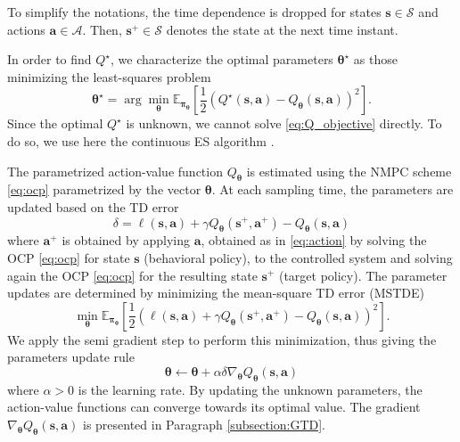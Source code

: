 \documentclass[letterpaper, 10pt, conference]{ieeeconf}
\begin{document}
To simplify the notations, the time dependence is dropped for states $\mathbf{s}\in\mathcal{S}$ and actions $\mathbf{a}\in\mathcal{A}$.
Then, $\mathbf{s}^+\in\mathcal{S}$ denotes the state at the next time instant.

In order to find $Q^{\star}$, we characterize the optimal parameters $\boldsymbol{\theta}^{\star}$ as those minimizing the least-squares problem
\begin{equation}\label{eq:Q_objective}
	\boldsymbol{\theta}^{\star} = \arg \min_{\boldsymbol{\theta}} \mathbb{E}_{\boldsymbol{\pi}_{\boldsymbol{\theta}}}\left[\frac{1}{2}\left(Q^{\star}(\mathbf{s}, \mathbf{a})-Q_{\boldsymbol{\theta}}(\mathbf{s}, \mathbf{a})\right)^2\right].
\end{equation}
Since the optimal $Q^{\star}$ is unknown, we cannot solve \eqref{eq:Q_objective} directly.
To do so, we use here the continuous ES algorithm \cite{van2009theoretical}.

The parametrized action-value function $Q_{\boldsymbol{\theta}}$ is estimated using the NMPC scheme \eqref{eq:ocp} parametrized by the vector $\boldsymbol{\theta}$.
At each sampling time, the parameters are updated based on the TD error
\begin{equation}\label{eq:sarsa_tderror}
	\delta = \ell\left(\mathbf{s}, \mathbf{a}\right)  + \gamma Q_{\boldsymbol{\theta}}\left(\mathbf{s}^+, \mathbf{a}^+\right) - Q_{\boldsymbol{\theta}}\left(\mathbf{s}, \mathbf{a}\right)
\end{equation}
where $\mathbf{a}^+$ is obtained by applying $\mathbf{a}$, obtained as in \eqref{eq:action} by solving the OCP \eqref{eq:ocp} for state $\mathbf{s}$ (behavioral policy), to the controlled system and solving again the OCP \eqref{eq:ocp} for the resulting state $\mathbf{s}^+$ (target policy).
The parameter updates are determined by minimizing the mean-square TD error (MSTDE) %
\begin{equation}
	\min_{\boldsymbol{\theta}} \mathbb{E}_{\boldsymbol{\pi}_{\boldsymbol{\theta}}}\left[\frac{1}{2}\left(\ell\left(\mathbf{s}, \mathbf{a}\right)  + \gamma Q_{\boldsymbol{\theta}}\left(\mathbf{s}^+, \mathbf{a}^+\right)- Q_{\boldsymbol{\theta}}(\mathbf{s}, \mathbf{a})\right)^2\right].
\end{equation}
We apply the semi gradient step to perform this minimization, thus giving the parameters update rule
\begin{equation} \label{eq:expected_sarsa_update_parameters}
	\boldsymbol{\theta}\leftarrow \boldsymbol{\theta} + \alpha\delta\nabla_{\boldsymbol{\theta}}Q_{\boldsymbol{\theta}}(\mathbf{s}, \mathbf{a})
\end{equation}
where $ \alpha > 0 $ is the learning rate. By updating the unknown parameters, the action-value functions can converge towards its optimal value.
The gradient $\nabla_{\boldsymbol{\theta}}Q_{\boldsymbol{\theta}}(\mathbf{s}, \mathbf{a})$ is presented in Paragraph \ref{subsection:GTD}.
		
\end{document}
